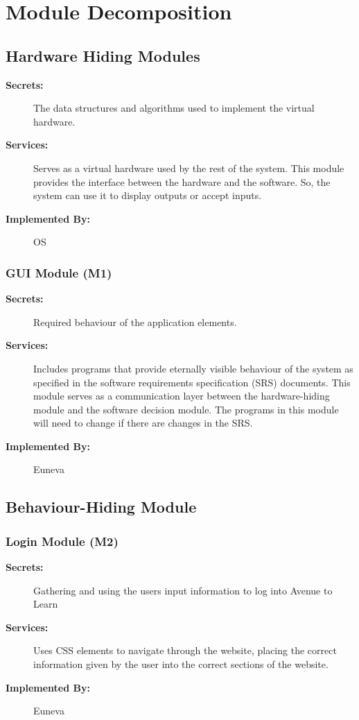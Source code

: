 \documentclass[12pt, titlepage]{article}
\begin{document}
\section{Module Decomposition}
\subsection{Hardware Hiding Modules}
\begin{description}
    \item[\textbf{Secrets:}] The data structures and algorithms used to implement the virtual hardware.
    \item[\textbf{Services:}] Serves as a virtual hardware used by the rest of the system. This module provides the interface between the hardware and the software. So, the system can use it to display outputs or accept inputs.
    \item[\textbf{Implemented By:}] OS
\end{description}

\subsubsection{GUI Module (M1)}
\begin{description}
    \item[\textbf{Secrets:}] Required behaviour of the application elements.
    \item[\textbf{Services:}] Includes programs that provide eternally visible behaviour of the system as specified in the software requirements specification (SRS) documents. This module serves as a communication layer between the hardware-hiding  module and the software decision module. The programs in this module will need to change if there are changes in the SRS.
    \item[\textbf{Implemented By:}] Euneva
\end{description}

\subsection{Behaviour-Hiding Module}
\subsubsection{Login Module (M2)}
\begin{description}
    \item[\textbf{Secrets:}] Gathering and using the users input information to log into Avenue to Learn
    \item[\textbf{Services:}] Uses CSS elements to navigate through the website, placing the correct information given by the user into the correct sections of the website.
    \item[\textbf{Implemented By:}] Euneva
\end{description}
\end{document}
